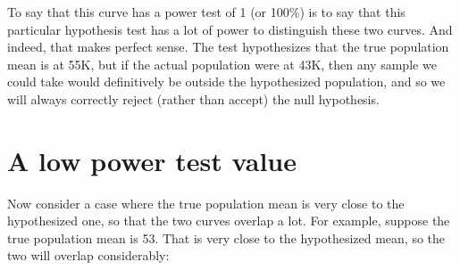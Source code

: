 \documentclass[../../../main.tex]{subfiles}
\begin{document}
\begin{center}
\end{center}

\noindent
To say that this curve has a power test of 1 (or 100\%) is to say that this particular hypothesis test has a lot of power to distinguish these two curves. And indeed, that makes perfect sense. The test hypothesizes that the true population mean is at 55K, but if the actual population were at 43K, then any sample we could take would definitively be outside the hypothesized population, and so we will always correctly reject (rather than accept) the null hypothesis.


\section{A low power test value}

Now consider a case where the true population mean is very close to the hypothesized one, so that the two curves overlap a lot. For example, suppose the true population mean is 53. That is very close to the hypothesized mean, so the two will overlap considerably:
\end{document}
